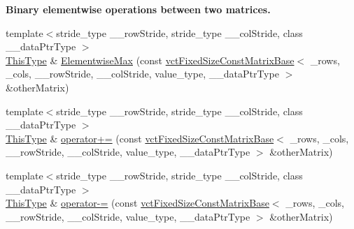 \begin{Indent}{\bf Binary elementwise operations between two matrices.}
\begin{DoxyCompactItemize}
\item 
{\footnotesize template$<$stride\+\_\+type \+\_\+\+\_\+row\+Stride, stride\+\_\+type \+\_\+\+\_\+col\+Stride, class \+\_\+\+\_\+data\+Ptr\+Type $>$ }\\\hyperlink{classvct_fixed_size_const_matrix_base_a7ec66a96ed7e08ce9ff54093133c9d8d}{This\+Type} \& \hyperlink{classvct_fixed_size_matrix_base_afc8bc0b07805adda8da3034388031c7f}{Elementwise\+Max} (const \hyperlink{classvct_fixed_size_const_matrix_base}{vct\+Fixed\+Size\+Const\+Matrix\+Base}$<$ \+\_\+rows, \+\_\+cols, \+\_\+\+\_\+row\+Stride, \+\_\+\+\_\+col\+Stride, value\+\_\+type, \+\_\+\+\_\+data\+Ptr\+Type $>$ \&other\+Matrix)
\item 
{\footnotesize template$<$stride\+\_\+type \+\_\+\+\_\+row\+Stride, stride\+\_\+type \+\_\+\+\_\+col\+Stride, class \+\_\+\+\_\+data\+Ptr\+Type $>$ }\\\hyperlink{classvct_fixed_size_const_matrix_base_a7ec66a96ed7e08ce9ff54093133c9d8d}{This\+Type} \& \hyperlink{classvct_fixed_size_matrix_base_a481eb2dec5b3cb9cf52a5be02cc6504d}{operator+=} (const \hyperlink{classvct_fixed_size_const_matrix_base}{vct\+Fixed\+Size\+Const\+Matrix\+Base}$<$ \+\_\+rows, \+\_\+cols, \+\_\+\+\_\+row\+Stride, \+\_\+\+\_\+col\+Stride, value\+\_\+type, \+\_\+\+\_\+data\+Ptr\+Type $>$ \&other\+Matrix)
\item 
{\footnotesize template$<$stride\+\_\+type \+\_\+\+\_\+row\+Stride, stride\+\_\+type \+\_\+\+\_\+col\+Stride, class \+\_\+\+\_\+data\+Ptr\+Type $>$ }\\\hyperlink{classvct_fixed_size_const_matrix_base_a7ec66a96ed7e08ce9ff54093133c9d8d}{This\+Type} \& \hyperlink{classvct_fixed_size_matrix_base_a412c8075ed71b4feea3b5d28ffb49eee}{operator-\/=} (const \hyperlink{classvct_fixed_size_const_matrix_base}{vct\+Fixed\+Size\+Const\+Matrix\+Base}$<$ \+\_\+rows, \+\_\+cols, \+\_\+\+\_\+row\+Stride, \+\_\+\+\_\+col\+Stride, value\+\_\+type, \+\_\+\+\_\+data\+Ptr\+Type $>$ \&other\+Matrix)
\end{DoxyCompactItemize}
\end{Indent}
